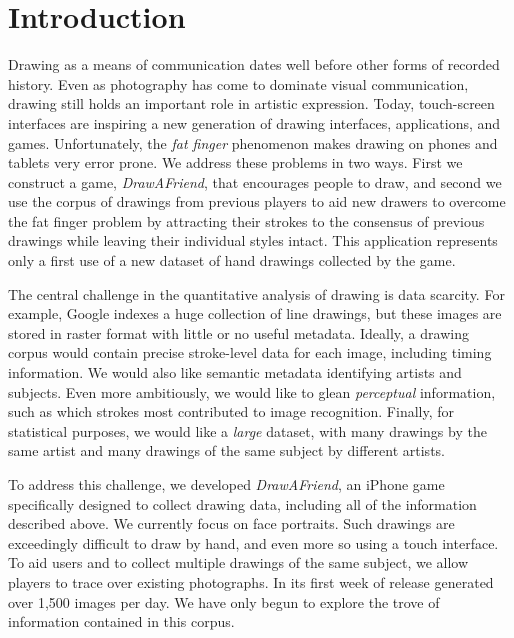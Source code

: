 \section{Introduction}

Drawing as a means of communication dates well before other forms of
recorded history. Even as photography has come to dominate visual
communication, drawing still holds an important role in artistic
expression. Today, touch-screen interfaces are inspiring a new
generation of drawing interfaces, applications, and games.
Unfortunately, the {\em fat finger} phenomenon makes drawing on
phones and tablets very error prone. We address these problems in
two ways. First we construct a game, {\em DrawAFriend}, that
encourages people to draw, and second we use the corpus of drawings
from previous players to aid new drawers to overcome the fat finger
problem by attracting their strokes to the consensus of previous
drawings while leaving their individual styles intact. This
application represents only a first use of a new dataset of hand
drawings collected by the game.

The central challenge in the quantitative analysis of drawing is
data scarcity. For example, Google indexes a huge collection of line
drawings, but these images are stored in raster format with little
or no useful metadata. Ideally, a drawing corpus would contain
precise stroke-level data for each image, including timing
information. We would also like semantic metadata identifying
artists and subjects. Even more ambitiously, we would like to glean
\emph{perceptual} information, such as which strokes most
contributed to image recognition. Finally, for statistical purposes,
we would like a \emph{large} dataset, with many drawings by the same
artist and many drawings of the same subject by different artists.

To address this challenge, we developed \emph{DrawAFriend}, an
iPhone game specifically designed to collect drawing data, including
all of the information described above. We currently focus on face
portraits. Such drawings are exceedingly difficult to draw by hand,
and even more so using a touch interface. To aid users and to
collect multiple drawings of the same subject, we allow players to
trace over existing photographs. In its first week of release \daf
generated over 1,500 images per day. We have only begun to explore
the trove of information contained in this \daf corpus.

